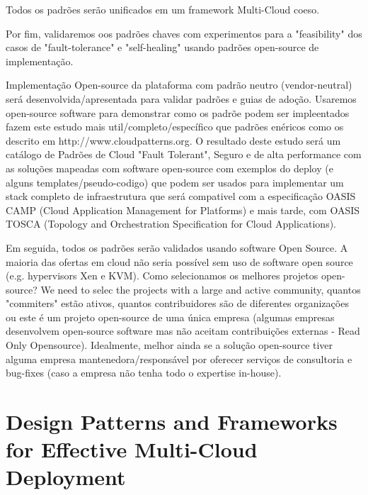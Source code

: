 \documentclass[12pt]{article}
\begin{document}
		Todos os padrões serão unificados em um framework Multi-Cloud coeso.
		
		Por fim, validaremos oos padrões chaves com experimentos para a "feasibility" dos casos de "fault-tolerance" e "self-healing" usando padrões open-source de implementação.
		
		Implementação Open-source da plataforma com padrão neutro (vendor-neutral) será desenvolvida/apresentada para validar padrões e guias de adoção. Usaremos open-source software para demonstrar como os padrõe podem ser impleentados fazem este estudo mais util/completo/específico que padrões enéricos como os descrito em http://www.cloudpatterns.org.
		O resultado deste estudo será um catálogo de Padrões de Cloud "Fault Tolerant", Seguro e de alta performance com as soluções mapeadas com software open-source com exemplos do deploy (e alguns templates/pseudo-codigo) que podem ser usados para implementar um stack completo de infraestrutura que será compativel com a especificação OASIS CAMP (Cloud Application Management for Platforms) e mais tarde, com OASIS TOSCA (Topology and Orchestration Specification for Cloud Applications).
		
		Em seguida, todos os padrões serão validados usando software Open Source. A maioria das ofertas em cloud não seria possível sem uso de software open source (e.g. hypervisors Xen e KVM). Como selecionamos os melhores projetos open-source? We need to selec the projects with a large and active community, quantos "commiters" estão ativos, quantos contribuidores são de diferentes organizações ou este é um projeto open-source de uma única empresa (algumas empresas desenvolvem open-source software mas não aceitam contribuições externas - Read Only Opensource). Idealmente, melhor ainda se a solução open-source tiver alguma empresa mantenedora/responsável por oferecer serviços de consultoria e bug-fixes (caso a empresa não tenha todo o expertise in-house). 
		
		
	\section{Design Patterns and Frameworks for Effective Multi-Cloud Deployment}
	
\end{document}
